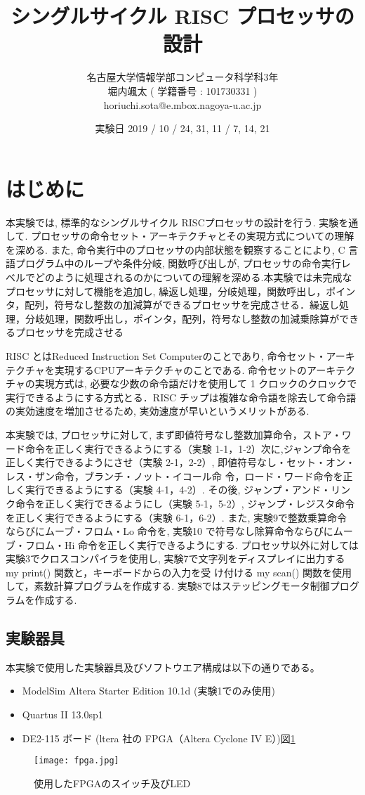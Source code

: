 \documentclass[epsf,a4paper,dvipdfmx,autodetect-engine,titlepage]{jsarticle}
\title{シングルサイクル RISC プロセッサの設計}
\author{名古屋大学情報学部コンピュータ科学科3年\\堀内颯太 ( 学籍番号 : 101730331 )\\horiuchi.sota@e.mbox.nagoya-u.ac.jp}
\date{実験日 2019 / 10 / 24, 31, 11 / 7, 14, 21}
\begin{document}
\maketitle
\tableofcontents
\newpage
\section{はじめに}
本実験では, 標準的なシングルサイクル RISCプロセッサの設計を行う. 実験を通して. プロセッサの命令セット・アーキテクチャとその実現方式についての理解を深める. また, 命令実行中のプロセッサの内部状態を観察することにより, C 言語プログラム中のループや条件分岐, 関数呼び出しが, プロセッサの命令実行レベルでどのように処理されるのかについての理解を深める.本実験では未完成なプロセッサに対して機能を追加し, 繰返し処理，分岐処理，関数呼出し，ポインタ，配列，符号なし整数の加減算ができるプロセッサを完成させる．繰返し処理，分岐処理，関数呼出し，ポインタ，配列，符号なし整数の加減乗除算ができるプロセッサを完成させる\par
RISC とはReduced Instruction Set Computerのことであり, 命令セット・アーキテクチャを実現するCPUアーキテクチャのことである. 命令セットのアーキテクチャの実現方式は, 必要な少数の命令語だけを使用して 1 クロックのクロックで実行できるようにする方式とる．RISC チップは複雑な命令語を除去して命令語の実効速度を増加させるため,  実効速度が早いというメリットがある.\par
本実験では, プロセッサに対して, まず即値符号なし整数加算命令，ストア・ワード命令を正しく実行できるようにする（実験 1-1，1-2）次に,ジャンプ命令を正しく実行できるようにさせ（実験 2-1，2-2）, 即値符号なし・セット・オン・レス・ザン命令，ブランチ・ノット・イコール命
令，ロード・ワード命令を正しく実行できるようにする（実験 4-1，4-2）. その後, ジャンプ・アンド・リンク命令を正しく実行できるようにし（実験 5-1，5-2）, ジャンプ・レジスタ命令を正しく実行できるようにする（実験 6-1，6-2）. また, 実験9で整数乗算命令 ならびにムーブ・フロム・Lo 命令を, 実験10 で符号なし除算命令ならびにムーブ・フロム・Hi 命令を正しく実行できるようにする. 
プロセッサ以外に対しては実験3でクロスコンパイラを使用し, 実験7で文字列をディスプレイに出力する my print() 関数と，キーボードからの入力を受
け付ける my scan() 関数を使用して，素数計算プログラムを作成する. 実験8ではステッピングモータ制御プログラムを作成する.

\subsection{実験器具}
本実験で使用した実験器具及びソフトウエア構成は以下の通りである。
\begin{itemize}
    \item ModelSim Altera Starter Edition 10.1d (実験1でのみ使用)
    \item Quartus II 13.0sp1
    \item DE2-115 ボード (ltera 社の FPGA（Altera Cyclone IV E）)図\ref{fig:fpga}
\end{itemize}
\begin{figure}
    \centering
    \texttt{[image: fpga.jpg]}
    \caption{使用したFPGAのスイッチ及びLED}
    \label{fig:fpga}
\end{figure}
\end{document}
